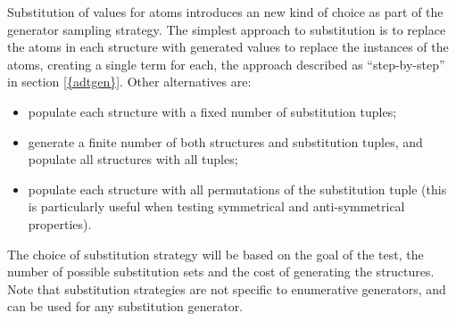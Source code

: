 Substitution of values for atoms introduces an new kind of choice 
as part of the generator sampling strategy.
The simplest approach to substitution is to 
replace the atoms in each structure with generated values
to replace the instances of the atoms, creating a single term for each,
the approach described as ``step-by-step'' in section \ref{{adtgen}}.
Other alternatives are:
\begin{itemize}
\item populate each structure with a fixed number of substitution tuples;
\item generate a finite number of both structures and substitution tuples, 
and populate all structures with all tuples;
\item populate each structure with all permutations of the substitution tuple
(this is particularly useful when testing symmetrical and anti-symmetrical properties).
\end{itemize}
The choice of substitution strategy will be based on 
the goal of the test,
the number of possible substitution sets and
the cost of generating the structures.
Note that substitution strategies are not specific to enumerative generators,
and can be used for any substitution generator.

